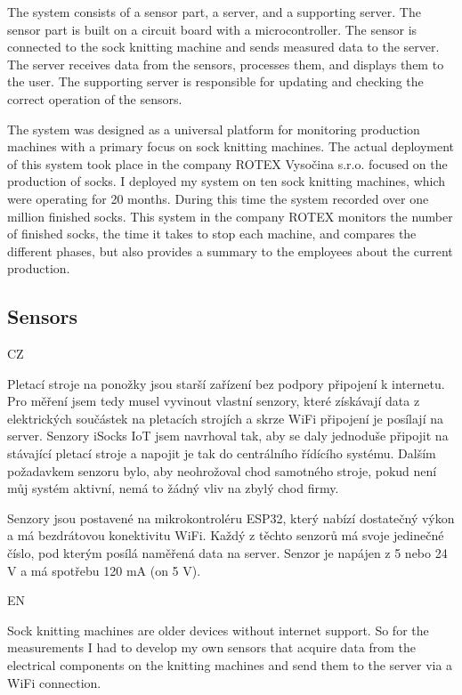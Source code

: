 \documentclass[12pt, a4paper]{article}
\begin{document}
The system consists of a sensor part, a server, and a supporting server.
The sensor part is built on a circuit board with a microcontroller.
The sensor is connected to the sock knitting machine and sends measured data to the server.
The server receives data from the sensors, processes them, and displays them to the user.
The supporting server is responsible for updating and checking the correct operation of the sensors.

The system was designed as a universal platform for monitoring production machines with a primary focus on sock knitting machines.
The actual deployment of this system took place in the company ROTEX Vysočina s.r.o. focused on the production of socks.
I deployed my system on ten sock knitting machines, which were operating for 20 months.
During this time the system recorded over one million finished socks.
This system in the company ROTEX monitors the number of finished socks, the time it takes to stop each machine, and compares the different phases, but also provides a summary to the employees about the current production.


\subsection*{Sensors}
CZ

Pletací stroje na ponožky jsou starší zařízení bez podpory připojení k internetu.
Pro měření jsem tedy musel vyvinout vlastní  senzory, které získávají data z elektrických součástek na pletacích  strojích a skrze WiFi připojení je posílají  na server.
Senzory iSocks IoT jsem navrhoval tak, aby se daly jednoduše připojit na stávající pletací stroje a napojit je tak do centrálního řídícího systému.
Dalším požadavkem senzoru bylo, aby neohrožoval chod samotného stroje, pokud není můj systém aktivní, nemá to žádný vliv na zbylý chod firmy.

Senzory jsou postavené na mikrokontroléru ESP32, který nabízí dostatečný výkon a má bezdrátovou konektivitu WiFi.
Každý z těchto senzorů má svoje jedinečné číslo, pod kterým posílá naměřená data na server.
Senzor je napájen z 5 nebo 24 V a má spotřebu 120 mA (on 5 V).

EN

Sock knitting machines are older devices without internet support.
So for the measurements I had to develop my own sensors that acquire data from the electrical components on the knitting machines and send them to the server via a WiFi connection.
\end{document}
